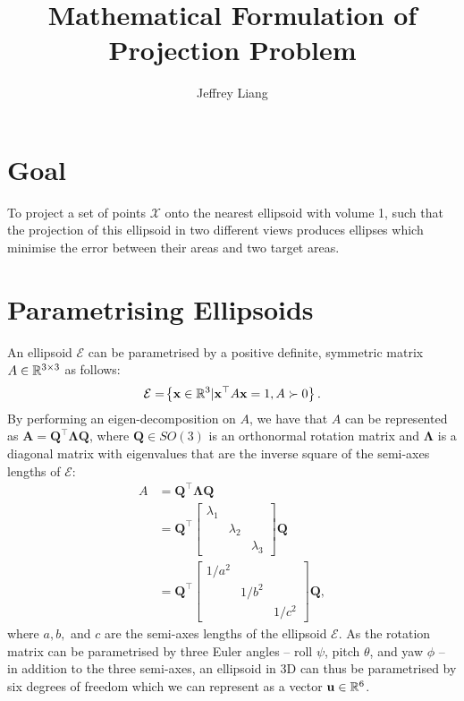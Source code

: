\documentclass{article}
\title{Mathematical Formulation of Projection Problem}
\author{Jeffrey Liang}
\newcommand{\x}{\mathbf{x}}
\begin{document}
\maketitle

\section{Goal}
To project a set of points $\mathcal X$ onto the nearest ellipsoid with volume 1, such that the projection of this ellipsoid in two different views produces ellipses which minimise the error between their areas and two target areas.

\section{Parametrising Ellipsoids}

An ellipsoid $\mathcal E$ can be parametrised by a positive definite, symmetric matrix $A \in \mathbb{R}^{3\times 3}$ as follows:
\begin{equation}
    \mathcal E = \lrbrace{\x \in \R^3 | \x^\top A \x = 1, A \succ 0}.
\end{equation}
By performing an eigen-decomposition on $A$, we have that $A$ can be represented as $\mathbf A= \mathbf Q^\top \mathbf  \Lambda \mathbf  Q$, where $\mathbf Q\in SO(3)$ is an orthonormal rotation matrix and $\mathbf \Lambda$ is a diagonal matrix with eigenvalues that are the inverse square of the semi-axes lengths of $\mathcal E$:
\begin{align}
    A &= \mathbf Q^\top \mathbf \Lambda \mathbf Q \\
        & = \mathbf Q^\top \begin{bmatrix}
            \lambda_1 & & \\
            & \lambda_2 & \\
            & & \lambda_3
        \end{bmatrix}\mathbf Q \\
        &= \mathbf Q^\top \begin{bmatrix}
            1/a^2 & & \\
            & 1/b^2 & \\
            & & 1/c^2
        \end{bmatrix}\mathbf Q,
\end{align}
where $a, b,$ and $c$ are the semi-axes lengths of the ellipsoid $\mathcal E$. As the rotation matrix can be parametrised by three Euler angles -- roll $\psi$, pitch $\theta$, and yaw $\phi$ -- in addition to the three semi-axes, an ellipsoid in 3D can thus be parametrised by six degrees of freedom which we can represent as a vector $\mathbf u \in \mathbb{R}^6$. 
\end{document}
